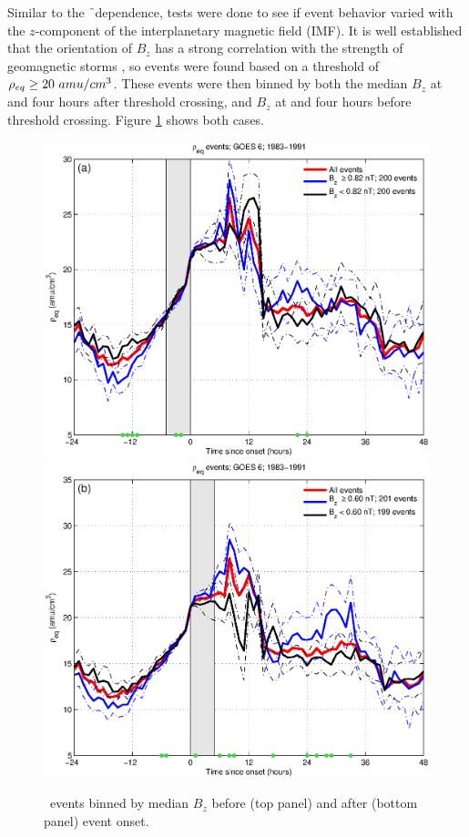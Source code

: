 Similar to the \f\ dependence, tests were done to see if event behavior varied with the $z$-component of the interplanetary magnetic field (IMF). It is well established that the orientation of $B_z$ has a strong correlation with the strength of geomagnetic storms \citep{Takahashi2010SolarCycleVariation}, so events were found based on a threshold of $\rho_{eq} \geq 20~amu/cm^3$. These events were then binned by both the median $B_z$ at and four hours after threshold crossing, and $B_z$ at and four hours before threshold crossing. Figure \ref{fig:RhoBinnedBz} shows both cases.

\begin{figure}[htp!]
	\centering
	\includegraphics[width=0.7\linewidth]{Figures/RhoBinnedB_z-case24-t020-tf25-GOES6}
	\includegraphics[width=0.7\linewidth]{Figures/RhoBinnedB_z-case24-t025-tf30-GOES6}	
	\caption{\req\ events binned by median $B_z$ before (top panel) and after (bottom panel) event onset.}
	\label{fig:RhoBinnedBz}
\end{figure}

